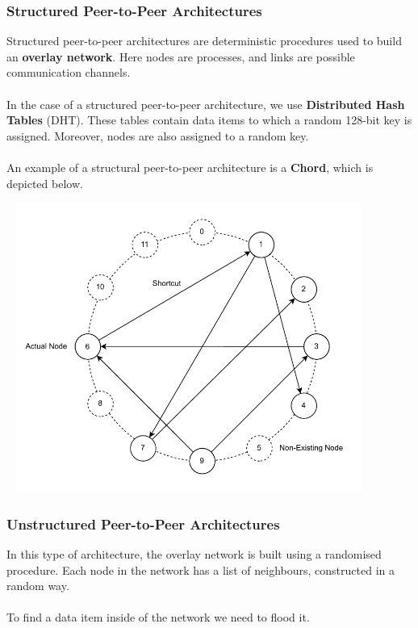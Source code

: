 \documentclass{article}
\begin{document}
\subsubsection{Structured Peer-to-Peer Architectures}
Structured peer-to-peer architectures are deterministic procedures used to build an \textbf{overlay network}. Here nodes are processes, and links are possible communication channels. \\ \\
In the case of a structured peer-to-peer architecture, we use \textbf{Distributed Hash Tables} (DHT). These tables contain data items to which a random 128-bit key is assigned. Moreover, nodes are also assigned to a random key. \\ \\
An example of a structural peer-to-peer architecture is a \textbf{Chord}, which is depicted below.

\begin{center}
	\includegraphics[width=12cm, height=9.5cm, keepaspectratio]{assets/chord.pdf}
\end{center}

\subsubsection{Unstructured Peer-to-Peer Architectures}
In this type of architecture, the overlay network is built using a randomised procedure. Each node in the network has a list of neighbours, constructed in a random way. \\ \\
To find a data item inside of the network we need to flood it.
\end{document}
